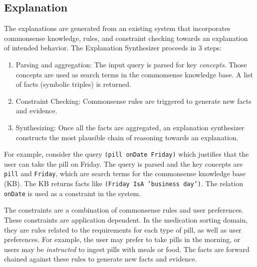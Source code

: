 \documentclass[letterpaper]{article} %
\begin{document}




\subsection{Explanation}
The explanations are generated from an existing
system \cite{gilpin2018monitoring,leilanithesis} that incorporates commonsense
knowledge, rules, and constraint checking towards an explanation of
intended behavior.  The Explanation Synthesizer proceeds in 3 steps:
\begin{enumerate}
\item Parsing and aggregation: The input query is parsed for key \emph{concepts}.  Those
concepts are used as search terms in the commonsense knowledge base.  A list of facts (symbolic triples) is returned.
\item Constraint Checking: Commonsense rules are triggered to generate
new facts and evidence.
\item Synthesizing: Once all the facts are aggregated, an explanation
synthesizer constructs the most plausible chain of reasoning
towards an explanation.
\end{enumerate}

For example, consider the query \texttt{(pill onDate Friday)} which justifies that the user can take the pill on Friday.  The query is parsed and
the key concepts are \texttt{pill} and \texttt{Friday}, which are search terms for
the commonsense knowledge base (KB).  The KB returns facts like
\texttt{(Friday IsA 'business day')}.  The relation \texttt{onDate} is
used as a constraint in the system.  

The constraints are a combination of commonsense rules and user
preferences.  These constraints are application dependent.   In the
medication sorting domain, they are rules related to the requirements
for each type of pill, as well as user preferences.  For example, the
user may prefer to take pills in the morning, or users may be
\emph{instructed} to ingest pills with meals or food.  The facts are
forward chained against these rules to generate new facts and
evidence.  
\end{document}

